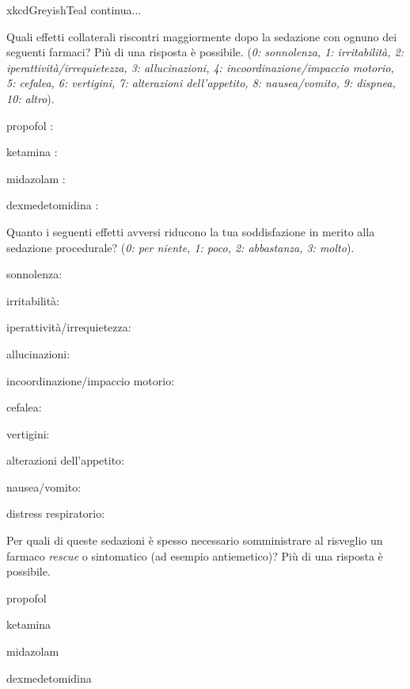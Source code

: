 \begin{survey}{xkcdGreyishTeal}
       \hfill continua...
       
       \newpage
       
       \Query Quali effetti collaterali riscontri maggiormente dopo la sedazione con ognuno dei seguenti farmaci? Più di una risposta è possibile. (\emph{0: sonnolenza, 1: irritabilità, 2: iperattività/irrequietezza, 3: allucinazioni, 4: incoordinazione/impaccio motorio, 5: cefalea, 6: vertigini, 7: alterazioni dell’appetito, 8: nausea/vomito, 9: dispnea, 10: altro}). 
    
           propofol : \hfill {} 
           
           ketamina : \hfill {} 
           
           midazolam : \hfill {} 
           
           dexmedetomidina : \hfill {} 
    
       \Query Quanto i seguenti effetti avversi riducono la tua soddisfazione in merito alla sedazione procedurale? (\emph{0: per niente, 1: poco, 2: abbastanza, 3: molto}).
       
           sonnolenza: \hfill {} 
           
           
           irritabilità:  \hfill {}
           
           iperattività/irrequietezza: \hfill {}
           
           allucinazioni: \hfill {}
           
           incoordinazione/impaccio motorio: \hfill {}
           
           cefalea: \hfill {}
           
           vertigini: \hfill {}
           
           alterazioni dell’appetito: \hfill {}
           
           nausea/vomito: \hfill {}
           
           distress respiratorio: \hfill {}
    
       \Query Per quali di queste sedazioni è spesso necessario somministrare al risveglio un farmaco \emph{rescue} o sintomatico (ad esempio antiemetico)? Più di una risposta è possibile.
       \begin{Qlist}
           \item propofol 
           \item ketamina 
           \item midazolam 
           \item dexmedetomidina 
       \end{Qlist}
       

\end{survey}
